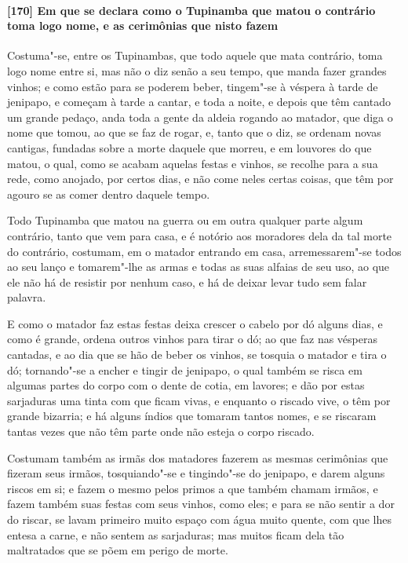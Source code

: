 \begin{linenumbers}
\paragraph{[170] Em que se declara como o Tupinamba que matou o contrário toma logo nome, e
as cerimônias que nisto fazem}\quad
Costuma"-se, entre os Tupinambas, que todo aquele que mata contrário, toma logo nome entre
si, mas não o diz senão a seu tempo, que manda fazer grandes vinhos; e como estão para se
poderem beber, tingem"-se à véspera à tarde de jenipapo, e começam à tarde a cantar, e toda
a noite, e depois que têm cantado um grande pedaço, anda toda a gente da aldeia rogando ao
matador, que diga o nome que tomou, ao que se faz de rogar, e, tanto que o diz, se ordenam
novas cantigas, fundadas sobre a morte daquele que morreu, e em louvores do que matou, o
qual, como se acabam aquelas festas e vinhos, se recolhe para a sua rede, como anojado,
por certos dias, e não come neles certas coisas, que têm por agouro se as comer dentro
daquele tempo.

Todo Tupinamba que matou na guerra ou em outra qualquer parte algum contrário, tanto que
vem para casa, e é notório aos moradores dela da tal morte do contrário, costumam, em o
matador entrando em casa, arremessarem"-se todos ao seu lanço e tomarem"-lhe as armas e
todas as suas alfaias de seu uso, ao que ele não há de resistir por nenhum caso, e há de
deixar levar tudo sem falar palavra.

E como o matador faz estas festas deixa crescer o cabelo por dó alguns dias, e como é
grande, ordena outros vinhos para tirar o dó; ao que faz nas vésperas cantadas, e ao dia
que se hão de beber os vinhos, se tosquia o matador e tira o dó; tornando"-se a encher e
tingir de jenipapo, o qual também se risca em algumas partes do corpo com o dente de
cotia, em lavores; e dão por estas sarjaduras uma tinta com que ficam vivas, e enquanto o
riscado vive, o têm por grande bizarria; e há alguns índios que tomaram tantos nomes, e se
riscaram tantas vezes que não têm parte onde não esteja o corpo riscado.

Costumam também as irmãs dos matadores fazerem as mesmas cerimônias que fizeram seus
irmãos, tosquiando"-se e tingindo"-se do jenipapo, e darem alguns riscos em si; e fazem o
mesmo pelos primos a que também chamam irmãos, e fazem também suas festas com seus vinhos,
como eles; e para se não sentir a dor do riscar, se lavam primeiro muito espaço com água
muito quente, com que lhes entesa a carne, e não sentem as sarjaduras; mas muitos ficam
dela tão maltratados que se põem em perigo de morte.


\end{linenumbers}
